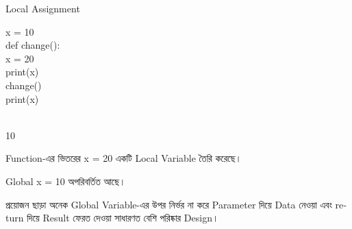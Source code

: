 \begin{codeoutputbox}{Local Assignment}

\noindent
\begin{minipage}[t]{0.52\linewidth}
\codeheading

\begin{english}
\ttfamily
x = 10\\[0.5mm]
def change():\\
\hspace*{4mm}x = 20\\
\hspace*{4mm}print(x)\\[0.5mm]
change()\\
print(x)
\end{english}

\end{minipage}
\hfill
\begin{minipage}[t]{0.44\linewidth}
\outputheading

\begin{english}
\\
10
\end{english}

\medskip

Function-এর ভিতরের
\textenglish{\ttfamily x = 20}
একটি Local Variable তৈরি করেছে।

Global
\textenglish{\ttfamily x = 10}
অপরিবর্তিত আছে।

\end{minipage}

\end{codeoutputbox}



প্রয়োজন ছাড়া অনেক Global Variable-এর উপর নির্ভর না করে
Parameter দিয়ে Data নেওয়া এবং
\textenglish{\ttfamily return}
দিয়ে Result ফেরত দেওয়া সাধারণত বেশি পরিষ্কার Design।

